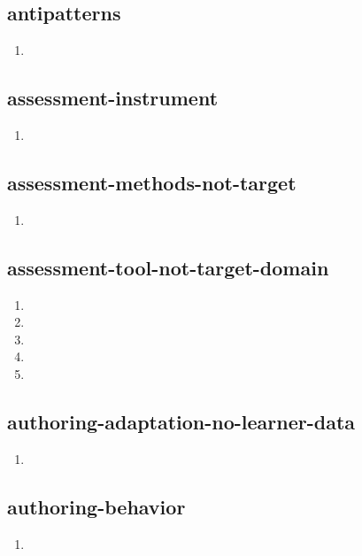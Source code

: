 \documentclass{article}
\begin{document}
\subsection{antipatterns}
\begin{enumerate}
\item {}
\end{enumerate}

\subsection{assessment-instrument}
\begin{enumerate}
\item {}
\end{enumerate}

\subsection{assessment-methods-not-target}
\begin{enumerate}
\item {}
\end{enumerate}

\subsection{assessment-tool-not-target-domain}
\begin{enumerate}
\item {}
\item {}
\item {}
\item {}
\item {}
\end{enumerate}

\subsection{authoring-adaptation-no-learner-data}
\begin{enumerate}
\item {}
\end{enumerate}

\subsection{authoring-behavior}
\begin{enumerate}
\item {}
\end{enumerate}
\end{document}
